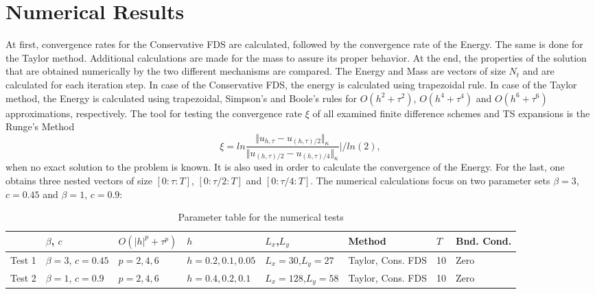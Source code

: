 \documentclass[%
 aip,
cp,  %
 amsmath,amssymb,%
 reprint,%
]{revtex4-2}
\begin{document}
\section{Numerical Results}

At first, convergence rates for the Conservative FDS are calculated, followed by the convergence rate of the Energy. The same is done for the Taylor method. Additional calculations are made for the mass to assure its proper behavior. At the end, the properties of the solution that are obtained numerically by the two different mechanisms are compared. The Energy and Mass are vectors of size $N_t$ and are calculated for each iteration step. In case of the Conservative FDS, the energy is calculated using trapezoidal rule. In case of the Taylor method, the Energy is calculated using trapezoidal, Simpson's and Boole's rules for $O(h^{2} + \tau^2 )$, $O(h^{4} + \tau^4 )$ and $O(h^{6} + \tau^6 )$ approximations, respectively. The tool for testing the convergence rate $\xi$ of all examined finite difference schemes and TS expansions is the Runge's Method
\begin{equation}\label{Runge}
\xi = ln  \frac{\Vert u_{h,\tau} - u_{(h,\tau)/2} \Vert_\kappa } {\Vert  u_{(h,\tau)/2} - u_{(h,\tau)/4} \Vert_\kappa  } | / ln(2),
\end{equation}
when no exact solution to the problem is known. It is also used in order to calculate the convergence of the Energy. For the last, one obtains three nested vectors of size $[0:\tau:T]$, $[0:\tau/2:T]$ and $[0:\tau/4:T]$. The numerical calculations focus on two parameter sets $\beta = 3$, $c=0.45$ and $\beta = 1$, $c=0.9$:

\begin{table}[H]
\centering
\small
		\begin{tabular}{||c|l|l|l|l|l|l|l||}
			\hline
			\hline
                                            &    $\beta$, $c$                              & $O(|h|^p + \tau^p)$   &      $h$                                & $L_x$,$L_y$                              &  Method & $T$      &  Bnd. Cond.   \\
   			\hline 
					\hline
           Test 1                        &      $\beta = 3$, $c=0.45$           &      $p=2, 4, 6$             &    $h=0.2, 0.1, 0.05$      & $L_x = 30$,$L_y=27$                & Taylor, Cons. FDS &                10    &    Zero  \\
	   \hline
			\hline 
           Test 2                        &      $\beta = 1$, $c=0.9$             &      $p=2, 4, 6$             &     $h=0.4, 0.2, 0.1$       & $L_x = 128$,$L_y=58$              & Taylor, Cons. FDS  &               10    &   Zero  \\
	   \hline
			\hline 
		\end{tabular}
\caption{Parameter table for the numerical tests}
\label{tableT}
\end{table}
\end{document}
